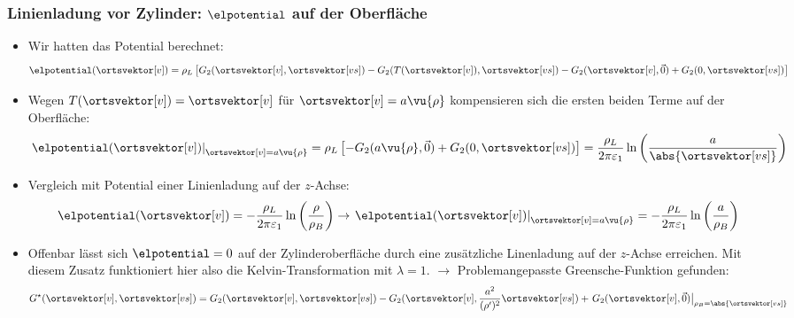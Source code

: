     \begin{frame}
\frametitle{Linienladung vor Zylinder: $\elpotential$ auf der Oberfläche}
\begin{itemize}[<+->]
\item Wir hatten das Potential berechnet:
  \begin{equation*}
    \elpotential(\ortsvektor[v]) = \rho_L \left[ G_2(\ortsvektor[v], \ortsvektor[vs]) - G_2(T(\ortsvektor[v]), \ortsvektor[vs]) - G_2(\ortsvektor[v], \vec{0}) + G_2(0, \ortsvektor[vs])\right]
  \end{equation*}
\item Wegen $T(\ortsvektor[v])=\ortsvektor[v]$ für $\ortsvektor[v] =a\vu{\rho} $ kompensieren sich die ersten beiden Terme auf der Oberfläche:
  \begin{equation*}
    \left.\elpotential(\ortsvektor[v])\right|_{\ortsvektor[v] =a\vu{\rho}} = \rho_L \left[ - G_2(a\vu{\rho}, \vec{0}) + G_2(0, \ortsvektor[vs])\right] = \frac{\rho_L}{2\pi\varepsilon_1} \ln\left(\frac{a}{\abs{\ortsvektor[vs]}} \right) 
  \end{equation*}
\item Vergleich mit Potential einer Linienladung auf der $z$-Achse:
  \begin{equation*}
      \elpotential(\ortsvektor[v]) = -\frac{\rho_L}{2\pi\varepsilon_1} \ln\left(\frac{\rho}{\rho_B} \right) \rightarrow \left.\elpotential(\ortsvektor[v])\right|_{\ortsvektor[v] =a\vu{\rho}} = -\frac{\rho_L}{2\pi\varepsilon_1} \ln\left(\frac{a}{\rho_B} \right)
    \end{equation*}
  \item Offenbar lässt sich $\elpotential =0$ auf der Zylinderoberfläche durch eine zusätzliche Linenladung auf der $z$-Achse erreichen. Mit diesem Zusatz funktioniert hier also die Kelvin-Transformation mit $\lambda = 1$. $\to$ \alert{Problemangepasste Greensche-Funktion gefunden:}
    \begin{equation*}
      G^\star (\ortsvektor[v], \ortsvektor[vs]) = G_2(\ortsvektor[v], \ortsvektor[vs]) - G_2(\ortsvektor[v], \frac{a^2}{(\rho^\prime)^2}\ortsvektor[vs] )+ \left.G_2(\ortsvektor[v], \vec{0})\right|_{\rho_B = \abs{\ortsvektor[vs]}}
      \end{equation*}
  \end{itemize}
      \end{frame}



      

